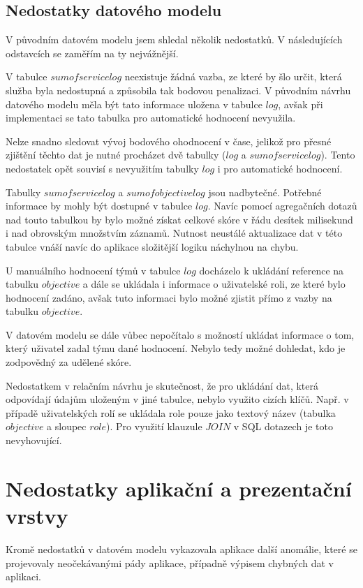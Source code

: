 \documentclass[
  digital, %
  twoside, %
  table,   %
  lof,     %
  lot,     %
]{fithesis3}
\begin{document}
\subsection{Nedostatky datového modelu}

V původním datovém modelu jsem shledal několik nedostatků. V následujících odstavcích se zaměřím na ty nejvážnější.

V tabulce $sumofservicelog$ neexistuje žádná vazba, ze které by šlo určit, která služba byla nedostupná a způsobila tak bodovou penalizaci. V původním návrhu datového modelu měla být tato informace uložena v tabulce $log$, avšak při implementaci se tato tabulka pro automatické hodnocení nevyužila. 

Nelze snadno sledovat vývoj bodového ohodnocení v čase, jelikož pro přesné zjištění těchto dat je nutné procházet dvě tabulky ($log$ a $sumofservicelog$). Tento nedostatek opět souvisí s nevyužitím tabulky $log$ i pro automatické hodnocení.

Tabulky $sumofservicelog$ a $sumofobjectivelog$ jsou nadbytečné. Potřebné informace by mohly být dostupné v tabulce $log$. Navíc pomocí agregačních dotazů nad touto tabulkou by bylo možné získat celkové skóre v řádu desítek milisekund i nad obrovským množstvím záznamů. Nutnost neustálé aktualizace dat v této tabulce vnáší navíc do aplikace složitější logiku náchylnou na chybu. 

U manuálního hodnocení týmů v tabulce $log$ docházelo k ukládání reference na tabulku $objective$ a dále se ukládala i informace o uživatelské roli, ze které bylo hodnocení zadáno, avšak tuto informaci bylo možné zjistit přímo z vazby na tabulku $objective$.

V datovém modelu se dále vůbec nepočítalo s možností ukládat informace o tom, který uživatel zadal týmu dané hodnocení. Nebylo tedy možné dohledat, kdo je zodpovědný za udělené skóre.

Nedostatkem v relačním návrhu je skutečnost, že pro ukládání dat, která odpovídají údajům uloženým v jiné tabulce, nebylo využito cizích klíčů. Např. v případě uživatelských rolí se ukládala role pouze jako textový název  (tabulka $objective$ a sloupec $role$). Pro využití klauzule $JOIN$ v SQL dotazech je toto nevyhovující.

\section{Nedostatky aplikační a prezentační vrstvy}

Kromě nedostatků v datovém modelu vykazovala aplikace další anomálie, které se projevovaly neočekávanými pády aplikace, případně výpisem chybných dat v aplikaci.
\end{document}
